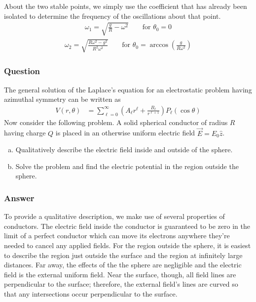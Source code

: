 About the two stable points, we simply use the coefficient that has already
been isolated to determine the frequency of the oscillations about that point.
\begin{align}
    \boxed{ {\omega}_1 = \sqrt{\frac{g}{R} - {\omega}^2} \quad\quad\text{for $\theta _0 = 0$} }
\end{align}
\begin{align}
    \boxed{ {\omega}_2 = \sqrt{\frac{R{\omega}^2 - g^2}{R^2{\omega}^2}}\quad\quad\text{for $\theta _0 =
        \arccos(\frac{g}{R{\omega}^2})$} }
\end{align}

\subsubsection{Question}

The general solution of the Laplace's equation for an electrostatic problem
having azimuthal symmetry can be written as
\begin{align*}
    V(r,\theta ) &= \sum_{\ell =0}^\infty  (A_\ell  r^\ell  + \frac{B_\ell }{r^{\ell +1}}) P_\ell (\cos \theta )
\end{align*}
Now consider the following problem. A solid spherical conductor of radius $R$
having charge $Q$ is placed in an otherwise uniform electric field $\vec E
= E_0\hat z$.
\begin{enumerate}[(a)]
    \item
        Qualitatively describe the electric field inside and outside of the
        sphere.
    \item
        Solve the problem and find the electric potential in the region outside
        the sphere.
\end{enumerate}

\subsubsection{Answer}

To provide a qualitative description, we make use of several properties of
conductors. The electric field inside the conductor is guaranteed to be zero
in the limit of a perfect conductor which can move its electrons anywhere
they're needed to cancel any applied fields. For the region outside the
sphere, it is easiest to describe the region just outside the surface and
the region at infinitely large distances. Far away, the effects of the the
sphere are negligible and the electric field is the external uniform field.
Near the surface, though, all field lines are perpendicular to the surface;
therefore, the external field's lines are curved so that any intersections
occur perpendicular to the surface.

